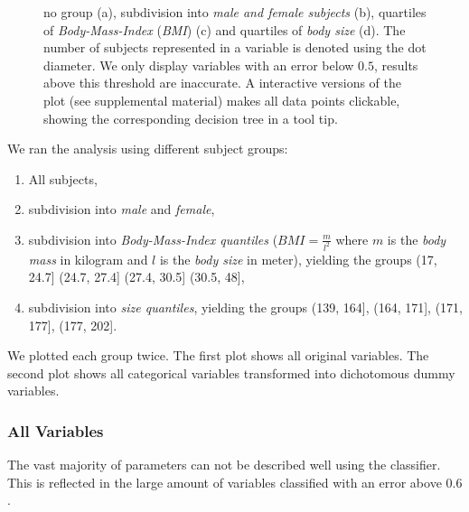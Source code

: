 \documentclass[a4paper,twoside]{style/article}
\begin{document}
\begin{figure}[p!]
{no group (a), subdivision into \emph{male and female subjects} (b), quartiles of \emph{Body-Mass-Index} (\emph{BMI}) (c) and quartiles of \emph{body size} (d).
The number of subjects represented in a variable is denoted using the dot diameter.
We only display variables with an error below $0.5$, results above this threshold are inaccurate.
A interactive versions of the plot (see supplemental material) makes all data points clickable, showing the corresponding decision tree in a tool tip.
}
  \label{fig:results}
\end{figure}
We ran the analysis using different subject groups:
\begin{enumerate}
	\item All subjects,
	\item subdivision into \emph{male} and \emph{female},
	\item subdivision into \emph{Body-Mass-Index quantiles} ($BMI = \frac{m}{l^2}$ where $m$ is the \emph{body mass} in kilogram and $l$ is the \emph{body size} in meter), yielding the groups (17, 24.7] (24.7, 27.4] (27.4, 30.5] (30.5, 48],
	\item subdivision into \emph{size quantiles}, yielding the groups (139, 164], (164, 171], (171, 177], (177, 202].
\end{enumerate}
We plotted each group twice.
The first plot shows all original variables.
The second plot shows all categorical variables transformed into dichotomous dummy variables.

\subsubsection{All Variables}
The vast majority of parameters can not be described well using the classifier.
This is reflected in the large amount of variables classified with an error above $0.6$.
\end{document}

